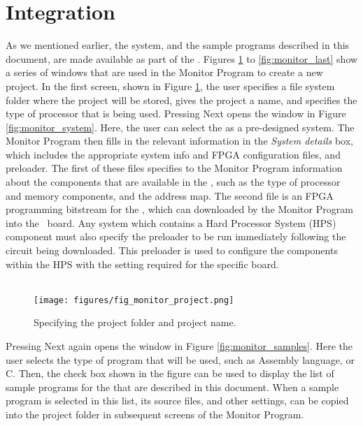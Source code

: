 \newpage
\section{\productNameMed{} Integration} 
\label{sec:monitor_program}

As we mentioned earlier, the {\it \systemNameFull} system, and the sample programs described
in this document, are made available as part of the \productNameMed{}. Figures
\ref{fig:monitor_project} to
\ref{fig:monitor_last} show a series of windows that are used in the Monitor 
Program to create a new project.
In the first screen, shown in Figure \ref{fig:monitor_project}, the user specifies a 
file system folder where the
project will be stored, gives the project a name, and specifies the type of processor that
is being used. Pressing {\sf Next} opens the window
in Figure \ref{fig:monitor_system}. Here, the user can select the {\it \systemNameFull} 
as a pre-designed system.
The Monitor Program then fills in the relevant information in the {\it System details} box,
which includes the appropriate system info and FPGA configuration files, and preloader.
The first of these files specifies to the Monitor Program information about the components 
that are available in the {\it \systemNameFull}, such as the type of processor and memory 
components, and the address map. The second file is an FPGA programming bitstream for 
the {\it \systemNameFull}, which can downloaded by the Monitor Program into the \DEBoard~board. 
Any system which contains a Hard Processor System (HPS) component must also specify the preloader to be
run immediately following the circuit being downloaded. This preloader is used to configure the components
within the HPS with the setting required for the specific board.
~\\
~\\
\begin{figure}[h!]
	\centering
	\texttt{[image: figures/fig\_monitor\_project.png]}
	\caption{Specifying the project folder and project name.}
	\label{fig:monitor_project}
\end{figure}

\clearpage
\newpage
Pressing {\sf Next} again opens the window in Figure \ref{fig:monitor_samples}. Here the
user selects the type of program that will be used, such as Assembly language, or C. Then,
the check box shown in the figure can be used to display the list of sample programs for
the {\it \systemNameFull} that are described in this document. When a sample program
is selected in this list, its source files, and other settings, can be copied into the 
project folder in subsequent screens of the Monitor Program.

